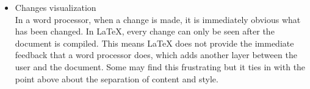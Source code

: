 \documentclass[12pt,letterpaper]{report}
\begin{document}
\begin{itemize}
\item Changes visualization
\\In a word processor, when a change is made, it is immediately obvious what has been changed. In LaTeX, every change can only be seen after the document is compiled. This means LaTeX does not provide the immediate feedback that a word processor does, which adds another layer between the user and the document. Some may find this frustrating but it ties in with the point above about the separation of content and style. 
\end{itemize}



%
\end{document}
